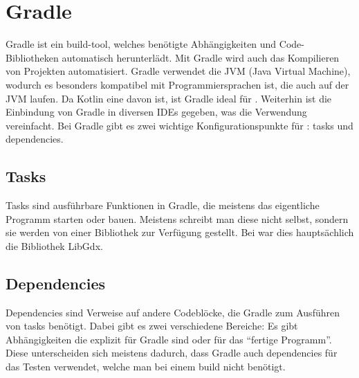 
\renewcommand{\kapitelautor}{Autor: Felix Zwickelstorfer}
\section{Gradle}\label{sec:gradle}

\renewcommand{\kapitelautor}{Autor: Felix Zwickelstorfer}

Gradle ist ein build-tool, welches benötigte Abhängigkeiten und Code-Bibliotheken automatisch herunterlädt.
Mit Gradle wird auch das Kompilieren von Projekten automatisiert.
Gradle verwendet die JVM (Java Virtual Machine), wodurch es besonders kompatibel mit Programmiersprachen ist, die auch auf der JVM laufen.
Da Kotlin eine davon ist, ist Gradle ideal für \FF.
Weiterhin ist die Einbindung von Gradle in diversen IDEs gegeben, was die Verwendung vereinfacht.
Bei Gradle gibt es zwei wichtige Konfigurationspunkte für \FF: tasks und dependencies.

\subsection{Tasks}\label{subsec:tasks}

Tasks sind ausführbare Funktionen in Gradle, die meistens das eigentliche Programm starten oder bauen.
Meistens schreibt man diese nicht selbst, sondern sie werden von einer Bibliothek zur Verfügung gestellt.
Bei \FF war dies hauptsächlich die Bibliothek LibGdx.

\subsection{Dependencies}\label{subsec:dependencies}

Dependencies sind Verweise auf andere Codeblöcke, die Gradle zum Ausführen von tasks benötigt.
Dabei gibt es zwei verschiedene Bereiche: Es gibt Abhängigkeiten die explizit für Gradle sind oder für das ``fertige Programm''.
Diese unterscheiden sich meistens dadurch, dass Gradle auch dependencies für das Testen verwendet, welche man bei einem build nicht benötigt.
